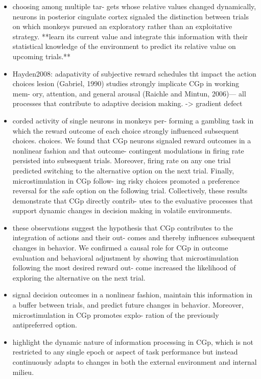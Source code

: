 \documentclass{article} %
\begin{document}
\begin{itemize}
\begin{itemize}
\item
choosing among multiple tar-
gets whose relative values changed dynamically,
neurons in posterior cingulate cortex signaled the distinction between trials on which monkeys pursued an exploratory rather than an exploitative strategy.
**learn its current value and integrate this information with their statistical knowledge of the environment to predict its relative value on upcoming trials.**


\item
Hayden2008: adapativity of subjective reward schedules tht impact the action choices
 lesion (Gabriel, 1990) studies strongly implicate CGp in working mem- ory, attention, and general arousal (Raichle and Mintun, 2006)— all processes that contribute to adaptive decision making. -> gradient defect

\item
corded activity of single neurons in monkeys per- forming a gambling task in which the reward outcome of each choice strongly influenced subsequent choices.
choices. We found that CGp neurons signaled reward outcomes in a nonlinear fashion and that outcome- contingent modulations in firing rate persisted into subsequent trials. Moreover, firing rate on any one trial predicted switching to the alternative option on the next trial. Finally, microstimulation in CGp follow- ing risky choices promoted a preference reversal for the safe option on the following trial. Collectively, these results demonstrate that CGp directly contrib- utes to the evaluative processes that support dynamic changes in decision making in volatile environments.

\item
 these observations suggest the hypothesis that CGp contributes to the integration of actions and their out- comes and thereby influences subsequent changes in behavior.
 We confirmed a causal role for CGp in outcome evaluation and behavioral adjustment by showing that microstimulation following the most desired reward out- come increased the likelihood of exploring the alternative on the next trial.

 \item
signal decision outcomes in a nonlinear fashion, maintain this information in a buffer between trials, and predict future changes in behavior. Moreover, microstimulation in CGp promotes explo- ration of the previously antipreferred option.

\item
highlight the dynamic nature of information processing in CGp, which is not restricted to any single epoch or aspect of task performance but instead continuously adapts to changes in both the external environment and internal milieu.



\end{itemize}
\end{itemize}
\end{document}
